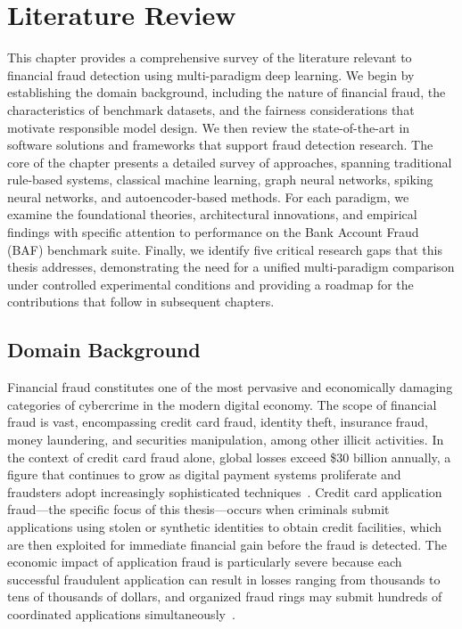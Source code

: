 \chapter{Literature Review}
\label{ch:litreview}

This chapter provides a comprehensive survey of the literature relevant to
financial fraud detection using multi-paradigm deep learning. We begin by
establishing the domain background, including the nature of financial fraud, the
characteristics of benchmark datasets, and the fairness considerations that
motivate responsible model design. We then review the state-of-the-art in
software solutions and frameworks that support fraud detection research. The
core of the chapter presents a detailed survey of approaches, spanning
traditional rule-based systems, classical machine learning, graph neural
networks, spiking neural networks, and autoencoder-based methods. For each
paradigm, we examine the foundational theories, architectural innovations, and
empirical findings with specific attention to performance on the Bank Account
Fraud (BAF) benchmark suite. Finally, we identify five critical research gaps
that this thesis addresses, demonstrating the need for a unified multi-paradigm
comparison under controlled experimental conditions and providing a roadmap for
the contributions that follow in subsequent chapters.

\section{Domain Background}

Financial fraud constitutes one of the most pervasive and economically damaging
categories of cybercrime in the modern digital economy. The scope of financial
fraud is vast, encompassing credit card fraud, identity theft, insurance fraud,
money laundering, and securities manipulation, among other illicit activities.
In the context of credit card fraud alone, global losses exceed \$30 billion
annually, a figure that continues to grow as digital payment systems proliferate
and fraudsters adopt increasingly sophisticated
techniques~\cite{singh2024comprehensive}. Credit card application fraud---the
specific focus of this thesis---occurs when criminals submit applications using
stolen or synthetic identities to obtain credit facilities, which are then
exploited for immediate financial gain before the fraud is detected. The
economic impact of application fraud is particularly severe because each
successful fraudulent application can result in losses ranging from thousands to
tens of thousands of dollars, and organized fraud rings may submit hundreds of
coordinated applications simultaneously~\cite{jesus2022bank}.

